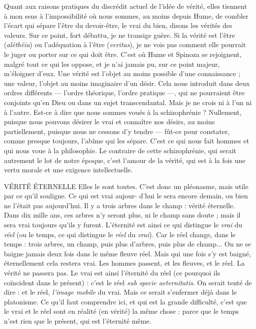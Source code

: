 Quant aux raisons pratiques du discrédit actuel de l’idée de vérité, elles
tiennent à mon sens à l'impossibilité où nous sommes, au moins depuis Hume,
de combler l'écart qui sépare l’être du devoir-être, le vrai du bien, disons les
vérités des valeurs. Sur ce point, fort débattu, je ne transige guère. Si la vérité
est l’être ({\it alèthéia}) ou l'adéquation à l’être ({\it veritas}), je ne vois pas comment elle
pourrait le juger ou porter sur ce qui doit être. C’est où Hume et Spinoza se
rejoignent, malgré tout ce qui les oppose, et je n’ai jamais pu, sur ce point
majeur, m’éloigner d’eux. Une vérité est l’objet au moins possible d’une
connaissance ; une valeur, l’objet au moins imaginaire d’un désir. Cela nous
introduit dans deux ordres différents — l’ordre théorique, l’ordre pratique —, qui
ne pourraient être conjoints qu’en Dieu ou dans un sujet transcendantal. Mais
je ne crois ni à l’un ni à l’autre. Est-ce à dire que nous sommes voués à la
schizophrénie ? Nullement, puisque nous pouvons désirer le vrai et connaître
nos désirs, au moins partiellement, puisque nous ne cessons d’y tendre — fût-ce
pour constater, comme presque toujours, l’abîme qui les sépare. C’est ce qui
nous fait hommes et qui nous voue à la philosophie. Le contraire de cette schizophrénie,
qui serait autrement le lot de notre époque, c’est l'amour de la
vérité, qui est à la fois une vertu morale et une exigence intellectuelle.

VÉRITÉ ÉTERNELLE Elles le sont toutes. C’est donc un pléonasme, mais
utile par ce qu’il souligne. Ce qui est vrai aujour-
d’hui le sera encore demain, ou bien ne l'était pas aujourd’hui. Il y a trois arbres
dans le champ : vérité éternelle. Dans dix mille ans, ces arbres n’y seront plus,
ni le champ sans doute ; mais il sera vrai toujours qu’ils y furent. L’éternité est
ainsi ce qui distingue le {\it vrai} du {\it réel} (ou le temps, ce qui distingue le {\it réel} du
{\it vrai}). Car le réel change, dans le temps : trois arbres, un champ, puis plus
d'arbres, puis plus de champ... On ne se baigne jamais deux fois dans le même
fleuve réel. Mais qui une fois s’y est baigné, éternellement cela restera vrai. Les
hommes passent, et les fleuves, et le réel. La vérité ne passera pas. Le vrai est
ainsi l'éternité du réel (ce pourquoi ils coïncident dans le présent) : c’est le réel
{\it sub specie aeternitatis}. On serait tenté de dire : et le réel, {\it l'image mobile} du vrai.
Mais ce serait s’enfermer déjà dans le platonisme. Ce qu’il faut comprendre ici,
et qui est la grande difficulté, c’est que le vrai et le réel sont en réalité (en vérité)
la même chose : parce que le temps n’est rien que le présent, qui est l'éternité
même.

